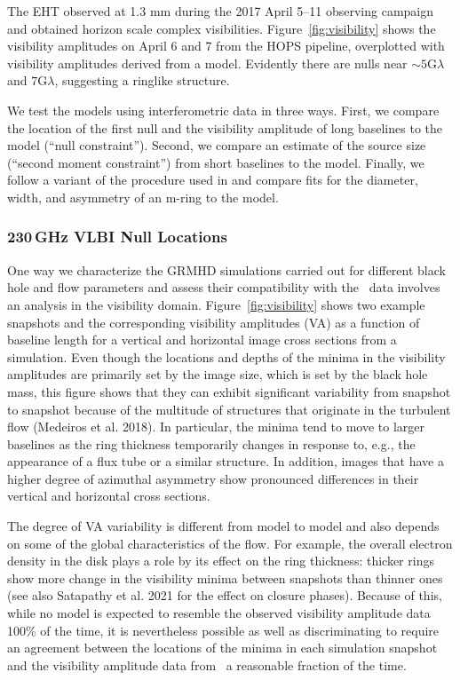 The EHT observed \sgra at 1.3 mm during the 2017 April 5--11 observing campaign and obtained horizon scale complex visibilities.  Figure~\ref{fig:visibility} shows the visibility amplitudes on April 6 and 7 from  the HOPS pipeline, overplotted with visibility amplitudes derived from a model.  Evidently there are nulls near $\sim 5\mathrm{G}\lambda$ and $7\mathrm{G}\lambda$, suggesting a ringlike structure.

We test the models using interferometric data in three ways.  First, we compare the location of the first null and the visibility amplitude of long baselines to the model (``null constraint'').  Second, we compare an estimate of the source size (``second moment constraint'') from short baselines to the model.  Finally, we follow a variant of the procedure used in  and compare fits for the diameter, width, and asymmetry of an m-ring to the model.  

\subsubsection{230\,GHz VLBI Null Locations}


One way we characterize the GRMHD simulations carried out for
different black hole and flow parameters and assess their
compatibility with the \sgra\ data involves an analysis in the visibility
domain.
Figure~\ref{fig:visibility} shows two example snapshots and the
corresponding visibility amplitudes (VA) as a function of baseline
length for a vertical and horizontal image cross sections from a
simulation.
Even though the locations and depths of the minima in the visibility
amplitudes are primarily set by the image size, which is set by the
black hole mass, this figure shows that they can exhibit significant
variability from snapshot to snapshot because of the multitude of
structures that originate in the turbulent flow (Medeiros et
al. 2018).
In particular, the minima tend to move to larger baselines as the ring
thickness temporarily changes in response to, e.g., the appearance of
a flux tube or a similar structure.
In addition, images that have a higher degree of azimuthal asymmetry
show pronounced differences in their vertical and horizontal cross
sections.

The degree of VA variability is different from model to model and also
depends on some of the global characteristics of the flow.
For example, the overall electron density in the disk plays a role by
its effect on the ring thickness: thicker rings show more change in
the visibility minima between snapshots than thinner ones (see also
Satapathy et al. 2021 for the effect on closure phases).
Because of this, while no model is expected to resemble the observed
visibility amplitude data 100\% of the time, it is nevertheless
possible as well as discriminating to require an agreement between the
locations of the minima in each simulation snapshot and the visibility
amplitude data from \sgra\ a reasonable fraction of the time.

